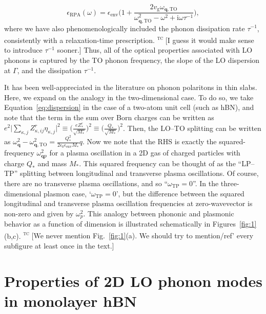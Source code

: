 \documentclass[aps,prb,twocolumn,
	           groupedaddress,superscriptaddress,
               amsfonts,amssymb,amsmath,floatfix,
	           citeautoscript]{revtex4-1}
\newcommand{\iu}{\mathrm{i}}
\newcommand{\comment}[2]{%
    \ifbool{togglecomments}%
    {\textcolor{blue!70!black}{\small\textsf{%
    \textsuperscript{\textsc{\textsf{\MakeLowercase{#1}}}}%
    [#2]}}} %
    {}}     %
\begin{document}
\begin{equation}
    \epsilon_{\mathrm{RPA}}(\omega) = \epsilon_{\mathrm{env}}\Bigg( 1 + \frac{2v_{\mathrm{g}}\omega_{\mathbf{q},\mathrm{TO}}}{\omega^2_{\mathbf{q},\mathrm{TO}}-\omega^2+\iu \omega \tau^{-1}}\Bigg),
\end{equation}
where we have also phenomenologically included the phonon dissipation rate $\tau^{-1}$, consistently with  a relaxation-time prescription. 
\comment{tc}{I guess it would make sense to introduce $\tau^{-1}$ sooner.}
Thus, all of the optical properties associated with LO phonons is captured by the TO phonon frequency, the slope of the LO dispersion at $\Gamma$, and the dissipation $\tau^{-1}$. %

It has been well-appreciated in the literature on phonon polaritons in thin slabs. Here, we expand on the analogy in the two-dimensional case. To do so, we take Equation~\eqref{eq:dispersion} in the case of a two-atom unit cell (such as hBN), and note that the term in the sum over Born charges can be written as $e^2\big|\sum_{\kappa,j}Z^r_{\kappa,ij}\eta_{\kappa,j}  \big|^2 \equiv  \Big(\frac{eZ^r_*}{\sqrt{M_*}}\Big)^2 \equiv \Big(\frac{Q_*}{\sqrt{M_*}}\Big)^2$. Then, the LO--TO splitting can be written as $\omega^2_{\mathbf{q}} - \omega^2_{\mathbf{q},\mathrm{TO}} = \frac{Q_*^2}{2\epsilon_0\epsilon_{\mathrm{env}} M_*}q$. Now we note that the RHS is exactly the squared-frequency $\omega^2_{\mathbf{q}p}$ for a plasma oscillation in a 2D gas of charged particles with charge $Q_*$ and mass $M_*$. This squared frequency can be thought of as the ``LP--TP'' splitting between longitudinal and transverse plasma oscillations. Of course, there are no transverse plasma oscillations, and so ``$\omega_{\mathrm{TP}} = 0$''. In the three-dimensional plasmon case, `$\omega_{\mathrm{TP}} = 0$', but the difference between the squared longitudinal and transverse plasma oscillation frequencies at zero-wavevector is non-zero and given by $\omega_p^2$. This analogy between phononic and plasmonic behavior as a function of dimension is illustrated schematically in Figures~\ref{fig:1}(b,c).
\comment{tc}{We never mention Fig.~\ref{fig:1}(a). We should try to mention/ref' every subfigure at least once in the text.}

\section{Properties of 2D LO phonon modes in monolayer hBN}
\end{document}
